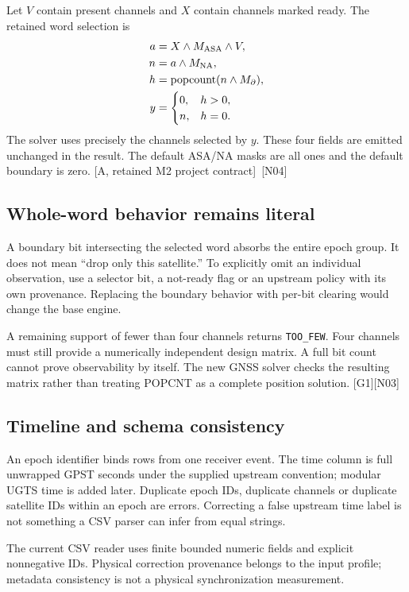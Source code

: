 \documentclass[11pt,a4paper]{article}
\newcommand{\code}[1]{\texttt{#1}}
\newcommand{\base}{\textcolor{muted}{[A, retained M2 project contract]}}
\newcommand{\ext}[1]{\textcolor{muted}{[#1]}}
\newcommand{\dec}[1]{\textcolor{accent}{[N#1]}}
\newcommand{\pop}{\operatorname{popcount}}
\begin{document}
Let $V$ contain present channels and $X$ contain channels marked ready. The retained
word selection is
\begin{align}
a&=X\land M_{\rm ASA}\land V,\\
n&=a\land M_{\rm NA},\\
h&=\pop(n\land M_\partial),\\
y&=\begin{cases}0,&h>0,\\n,&h=0.\end{cases}
\end{align}
The solver uses precisely the channels selected by $y$. These four fields are emitted
unchanged in the result. The default ASA/NA masks are all ones and the default boundary
is zero. \base\ \dec{04}

\subsection{Whole-word behavior remains literal}
A boundary bit intersecting the selected word absorbs the entire epoch group. It
does not mean ``drop only this satellite.'' To explicitly omit an individual observation,
use a selector bit, a not-ready flag or an upstream policy with its own provenance.
Replacing the boundary behavior with per-bit clearing would change the base engine.

A remaining support of fewer than four channels returns \code{TOO\_FEW}. Four channels
must still provide a numerically independent design matrix. A full bit count cannot
prove observability by itself. The new GNSS solver checks the resulting matrix rather
than treating POPCNT as a complete position solution. \ext{G1}\dec{03}

\subsection{Timeline and schema consistency}
An epoch identifier binds rows from one receiver event. The time column is full
unwrapped GPST seconds under the supplied upstream convention; modular UGTS time is
added later. Duplicate epoch IDs, duplicate channels or duplicate satellite IDs within
an epoch are errors. Correcting a false upstream time label is not something a CSV
parser can infer from equal strings.

The current CSV reader uses finite bounded numeric fields and explicit nonnegative
IDs. Physical correction provenance belongs to the input profile; metadata consistency
is not a physical synchronization measurement.
\clearpage
\end{document}
